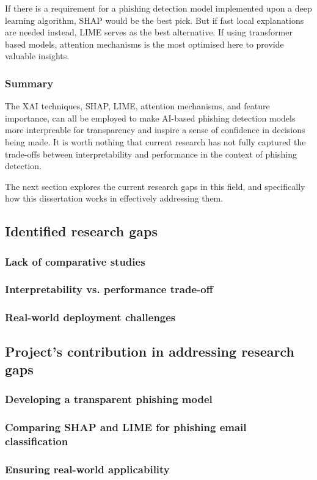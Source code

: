 \noindent If there is a requirement for a phishing detection model implemented upon a deep learning algorithm, SHAP would be the best pick. But if fast local explanations are needed instead, LIME serves as the best alternative. If using transformer based models, attention mechanisms is the most optimised here to provide valuable insights.

\subsubsection*{Summary}

\noindent The XAI techniques, SHAP, LIME, attention mechanisms, and feature importance, can all be employed to make AI-based phishing detection models more interpreable for transparency and inspire a sense of confidence in decisions being made. It is worth nothing that current research has not fully captured the trade-offs between interpretability and performance in the context of phishing detection.\newline

\noindent The next section explores the current research gaps in this field, and specifically how this dissertation works in effectively addressing them.

\subsection*{Identified research gaps}

\subsubsection*{Lack of comparative studies}

\subsubsection*{Interpretability vs. performance trade-off}

\subsubsection*{Real-world deployment challenges}

\newpage

\subsection*{Project's contribution in addressing research gaps}

\subsubsection*{Developing a transparent phishing model}

\subsubsection*{Comparing SHAP and LIME for phishing email classification}

\subsubsection*{Ensuring real-world applicability}
